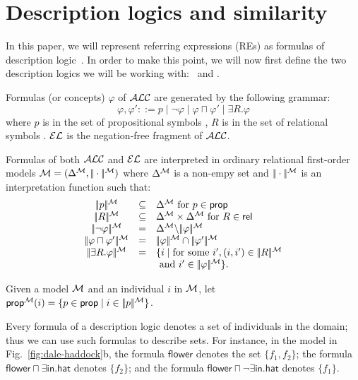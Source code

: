\section{Description logics and similarity}
\label{sec:bisim}

In this paper, we will represent referring expressions (REs) as
formulas of description logic~\cite{baad:desc03}.  In order to make
this point, we will now first define the two description logics we
will be working with: \alc\ and \el.


\begin{definition}
  Formulas (or concepts) $\varphi$ of $\mathcal{ALC}$ are generated by the
  following grammar:
$$
\varphi,\varphi' ::= p \mid \neg \varphi \mid \varphi \sqcap \varphi'
\mid \exists R. \varphi
$$
where $p$ is in the set of propositional symbols \prop, $R$ is in the
set of relational symbols \rel. $\mathcal{EL}$ is the negation-free fragment of $\mathcal{ALC}$.

Formulas of both $\mathcal{ALC}$ and $\mathcal{EL}$ are interpreted in ordinary
relational first-order models $\mathcal{M} = (\Delta^{\mathcal{M}},|\!|\cdot|\!|^{\mathcal{M}})$ where
$\Delta^{\mathcal{M}}$ is a non-empy set and $|\!|\cdot|\!|^{\mathcal{M}}$ is an
interpretation function such that:
$$
\begin{array}{ccl}
\interp{p}^\gM & \subseteq & \Delta^\gM  \mbox{ for $p \in \prop$}\\
\interp{R}^\gM & \subseteq & \Delta^\gM \times \Delta^\gM  \mbox{ for $R \in \rel$}\\
\interp{\neg \varphi}^\gM & = & \Delta^\gM \backslash \interp{\varphi}^\gM\\
\interp{\varphi \sqcap \varphi'}^\gM & = & \interp{\varphi}^\gM \cap \interp{\varphi'}^\gM\\
\interp{\exists R.\varphi}^\gM & = & \{i \mid \mbox{for some } i', (i,i') \in \interp{R}^\gM\\
& & \mbox{ and } i' \in \interp{\varphi}^\gM \}.\\
\end{array}
$$

Given a model $\mathcal{M}$ and an individual $i$ in $\mathcal{M}$, let
$\mathsf{prop}^{\mathcal{M}}(i) = \{p \in \mathsf{prop} \mid i \in |\!|p|\!|^{\mathcal{M}}\}$.
\end{definition}

Every formula of a description logic denotes a set of individuals in
the domain; thus we can use such formulas to describe sets.  For
instance, in the model in Fig.~\ref{fig:dale-haddock}b, the formula
$\mathsf{flower}$ denotes the set $\{f_1,f_2\}$; the formula
$\mathsf{flower} \sqcap \exists \mathsf{in}.\mathsf{hat}$ denotes
$\{f_2\}$; and the formula $\mathsf{flower} \sqcap \neg
\exists \mathsf{in}.\mathsf{hat}$ denotes $\{f_1\}$.

